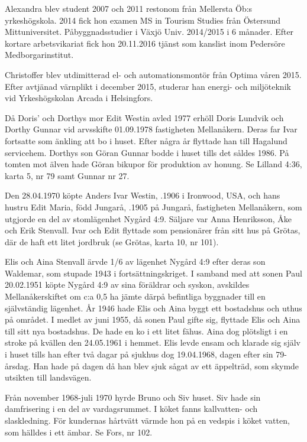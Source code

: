 Alexandra blev student 2007 och 2011 restonom från Mellersta Öb:s yrkeshögskola. 2014 fick hon examen MS in Tourism Studies från Östersund Mittuniversitet. Påbyggnadsstudier i Växjö Univ. 2014/2015 i 6 månader. Efter kortare arbetsvikariat fick hon 20.11.2016 tjänst som kanslist inom Pedersöre Medborgarinstitut.

Christoffer blev utdimitterad el- och automationsmontör från Optima våren 2015. Efter avtjänad värnplikt i december 2015, studerar han energi- och miljöteknik vid Yrkeshögskolan Arcada i Helsingfors.


Då Doris' och Dorthys mor Edit Westin avled 1977 erhöll Doris Lundvik och Dorthy Gunnar vid arvsskifte 01.09.1978 fastigheten Mellanåkern. Deras far Ivar fortsatte som änkling att bo i huset. Efter några år flyttade han till Hagalund servicehem. Dorthys son Göran Gunnar bodde i huset tills det såldes 1986. På tomten mot älven hade Göran bikupor för produktion av honung. Se Lilland 4:36, karta 5, nr 79 samt Gunnar nr 27.


Den 28.04.1970 köpte Anders Ivar Westin, .1906 i Ironwood, USA, och hans hustru Edit Maria, född Jungarå, .1905 	på Jungarå,	fastigheten Mellanåkern, som utgjorde en del av stomlägenhet Nygård 4:9. Säljare var Anna Henriksson, Åke och Erik Stenvall. Ivar och Edit flyttade som pensionärer från sitt hus på Grötas, där de haft ett litet jordbruk (se Grötas, karta 10, nr 101).


Elis och Aina Stenvall ärvde 1/6 av lägenhet Nygård 4:9 efter deras son Waldemar, som stupade 1943 i fortsättningskriget. I samband med att sonen Paul 20.02.1951 köpte Nygård 4:9 av sina föräldrar och syskon, avskildes Mellanåkerskiftet om c:a 0,5 ha jämte därpå befintliga byggnader till en självständig lägenhet. År 1946 hade Elis och Aina byggt ett bostadshus och uthus på området. I medlet av juni 1955, då sonen Paul gifte sig, flyttade Elis och Aina till sitt nya bostadshus. De hade en ko i ett litet fähus. Aina dog plötsligt i en stroke på kvällen den 24.05.1961 i hemmet. Elis levde ensam och klarade sig själv i huset tills han efter två dagar på sjukhus dog 19.04.1968, dagen efter sin 79-årsdag. Han hade på dagen då han blev sjuk sågat av ett äppelträd, som skymde utsikten till landsvägen.



Från november 1968-juli 1970 hyrde Bruno och Siv  huset. Siv hade sin damfrisering i en del av vardagsrummet. I köket fanns kallvatten- och slaskledning. För kundernas hårtvätt värmde hon på en	vedspis i köket vatten, som hälldes i ett ämbar. Se Fors, nr 102.

